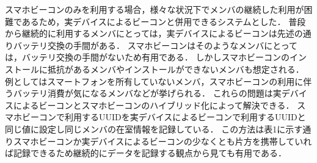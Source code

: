 スマホビーコンのみを利用する場合，様々な状況下でメンバの継続した利用が困難であるため，実デバイスによるビーコンと併用できるシステムとした．
普段から継続的に利用するメンバにとっては，実デバイスによるビーコンは先述の通りバッテリ交換の手間がある．
スマホビーコンはそのようなメンバにとっては，バッテリ交換の手間がないため有用である．
しかしスマホビーコンのインストールに抵抗があるメンバやインストールができないメンバも想定される．
例としてはスマートフォンを所有していないメンバ，スマホビーコンの利用に伴うバッテリ消費が気になるメンバなどが挙げられる．
これらの問題は実デバイスによるビーコンとスマホビーコンのハイブリッド化によって解決できる．
スマホビーコンで利用するUUIDを実デバイスによるビーコンで利用するUUIDと同じ値に設定し同じメンバの在室情報を記録している．
この方法は表1に示す通りスマホビーコンか実デバイスによるビーコンの少なくとも片方を携帯していれば記録できるため継続的にデータを記録する観点から見ても有用である．
\begin{table}[tbh]
    \caption{各ビーコンのみ対応時とハイブリッド対応時の比較}
    \label{multipleBPM}
\end{table}

